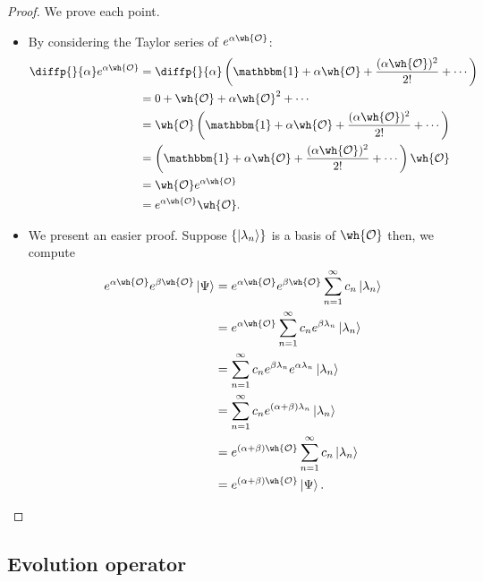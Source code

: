 \documentclass[12pt, a4paper]{article}
\begin{document}
\begin{proof}
    We prove each point.
    \begin{itemize}
        \item By considering the Taylor series of \(e^{\alpha\wh{\mathcal{O}}}\):
        \[\begin{aligned}
            \diffp{}{\alpha} e^{\alpha \wh{\mathcal{O}}} &= \diffp{}{\alpha} \left( \mathbbm{1} + \alpha \wh{\mathcal{O}}+ \frac{(\alpha \wh{\mathcal{O}})^2}{2!} + \cdots \right) \\
            &= 0 + \wh{\mathcal{O}} +\alpha \wh{\mathcal{O}}^2+ \cdots \\
            &= \wh{\mathcal{O}} \left( \mathbbm{1}+ \alpha \wh{\mathcal{O}}+ \frac{(\alpha \wh{\mathcal{O}})^2}{2!} +\cdots \right) \\
            &=\left( \mathbbm{1}+ \alpha \wh{\mathcal{O}}+ \frac{(\alpha \wh{\mathcal{O}})^2}{2!} +\cdots \right) \wh{\mathcal{O}} \\
            &= \wh{\mathcal{O}}e^{\alpha \wh{\mathcal{O}}} \\
            &= e^{\alpha \wh{\mathcal{O}}} \wh{\mathcal{O}}.
        \end{aligned}\]
        \item We present an easier proof. Suppose \(\{\ket{\lambda_n}\}\) is a basis of \(\wh{\mathcal{O}}\) then, we compute 
        \[\begin{aligned}
            e^{\alpha \wh{\mathcal{O}}} e^{\beta \wh{\mathcal{O}}} \ket{\Psi} &= e^{\alpha \wh{\mathcal{O}}} e^{\beta \wh{\mathcal{O}}} \sum_{n=1}^{\infty} c_n \ket{\lambda_n} \\
            &= e^{\alpha \wh{\mathcal{O}}} \sum_{n=1}^{\infty} c_n e^{\beta \lambda_n} \ket{\lambda_n} \\
            &= \sum_{n=1}^{\infty} c_n e^{\beta \lambda_n} e^{\alpha \lambda_n} \ket{\lambda_n} \\
            &= \sum_{n=1}^{\infty} c_n e^{(\alpha+\beta)\lambda_n} \ket{\lambda_n} \\
            &= e^{(\alpha+\beta)\wh{\mathcal{O}}}\sum_{n=1}^{\infty} c_n\ket{\lambda_n} \\
            &= e^{(\alpha+\beta) \wh{\mathcal{O}}} \ket{\Psi}.
        \end{aligned}\]
    \end{itemize}
\end{proof}

\subsection{Evolution operator}
\end{document}

